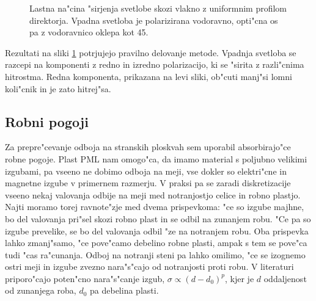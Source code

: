 \documentclass[a4paper,10pt]{article}
\begin{document}
\begin{figure}[h]
 \centering
 \caption{Lastna na"cina "sirjenja svetlobe skozi vlakno z uniformnim profilom direktorja. Vpadna svetloba je polarizirana vodoravno, opti"cna os pa z vodoravnico oklepa kot 45\degree. }
 \label{fig:pulse-0-mode}
\end{figure}

Rezultati na sliki \ref{fig:pulse-0-mode} potrjujejo pravilno delovanje metode. 
Vpadnja svetloba se razcepi na komponenti z redno in izredno polarizacijo, ki se "sirita z razli"cnima hitrostma. 
Redna komponenta, prikazana na levi sliki, ob"cuti manj"si lomni koli"cnik in je zato hitrej"sa. 

\subsection{Robni pogoji}
Za prepre"cevanje odboja na stranskih ploskvah sem uporabil absorbirajo"ce robne pogoje. 
Plast \acs{PML} nam omogo"ca, da imamo material s poljubno velikimi izgubami, pa vseeno ne dobimo odboja na meji, vse dokler so elektri"cne in magnetne izgube v primernem razmerju. 
V praksi pa se zaradi diskretizacije vseeno nekaj valovanja odbije na meji med notranjostjo celice in robno plastjo. 
Najti moramo torej ravnote"zje med dvema prispevkoma: "ce so izgube majhne, bo del valovanja pri"sel skozi robno plast in se odbil na zunanjem robu. 
"Ce pa so izgube prevelike, se bo del valovanja odbil "ze na notranjem robu. 
Oba prispevka lahko zmanj"samo, "ce pove"camo debelino robne plasti, ampak s tem se pove"ca tudi "cas ra"cunanja. 
Odboj na notranji steni pa lahko omilimo, "ce se izognemo ostri meji in izgube zvezno nara"s"cajo od notranjosti proti robu. 
V literaturi\cite{taflove} priporo"cajo poten"cno nara"s"canje izgub, $\sigma \propto (d-d_0)^{p}$, kjer je $d$ oddaljenost od zunanjega roba, $d_0$ pa debelina plasti. 
\end{document}
